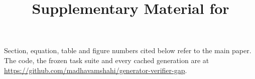 \documentclass[conference]{IEEEtran}
\newif\ifanon \anonfalse   %
\begin{document}
\title{Supplementary Material for\\ \papertitle}

\ifanon
  \author{\IEEEauthorblockN{Anonymous Submission}
  \IEEEauthorblockA{Paper ID \#XXXX}}
\else
  \author{%
  \and
  \and
  }
\fi

\maketitle

\noindent
Section, equation, table and figure numbers cited below refer to the main
paper. The code, the frozen task suite and every cached generation are at
\url{https://github.com/madhavamshahi/generator-verifier-gap}.

\appendices




\end{document}
